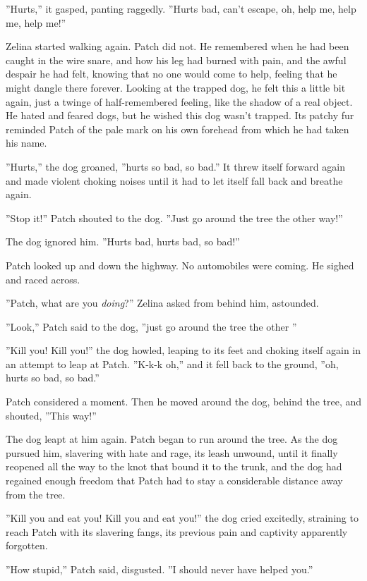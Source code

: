 \documentclass[12pt]{book}
\begin{document}
 ''Hurts,'' it gasped, panting raggedly. ''Hurts bad, can't escape, oh, help me, help me, help me!''\par
 Zelina started walking again. Patch did not. He remembered when he had been caught in the wire snare, and how his leg had burned with pain, and the awful despair he had felt, knowing that no one would come to help, feeling that he might dangle there forever. Looking at the trapped dog, he felt this a little bit again, just a twinge of half-remembered feeling, like the shadow of a real object. He hated and feared dogs, but he wished this dog wasn't trapped. Its patchy fur reminded Patch of the pale mark on his own forehead from which he had taken his name.\par
 ''Hurts,'' the dog groaned, ''hurts so bad, so bad.'' It threw itself forward again and made violent choking noises until it had to let itself fall back and breathe again.\par
 ''Stop it!'' Patch shouted to the dog. ''Just go around the tree the other way!''\par
 The dog ignored him. ''Hurts bad, hurts bad, so bad!''\par
 Patch looked up and down the highway. No automobiles were coming. He sighed and raced across.\par
 ''Patch, what are you {\it doing}?'' Zelina asked from behind him, astounded.\par
 ''Look,'' Patch said to the dog, ''just go around the tree the other %
''\par
 ''Kill you! Kill you!'' the dog howled, leaping to its feet and choking itself again in an attempt to leap at Patch. ''K-k-k%
oh,'' and it fell back to the ground, ''oh, hurts so bad, so bad.''\par
 Patch considered a moment. Then he moved around the dog, behind the tree, and shouted, ''This way!''\par
 The dog leapt at him again. Patch began to run around the tree. As the dog pursued him, slavering with hate and rage, its leash unwound, until it finally reopened all the way to the knot that bound it to the trunk, and the dog had regained enough freedom that Patch had to stay a considerable distance away from the tree.\par
 ''Kill you and eat you! Kill you and eat you!'' the dog cried excitedly, straining to reach Patch with its slavering fangs, its previous pain and captivity apparently forgotten.\par
 ''How stupid,'' Patch said, disgusted. ''I should never have helped you.''\par
\end{document}
